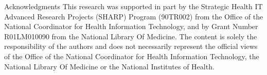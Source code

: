\documentclass[final]{beamer}
\newcommand{\code}[1]{\texttt{\small #1}}
\begin{document}
\begin{frame}[fragile]
\begin{columns}[t]
\begin{column}{.45\linewidth}
%
%

    \begin{block}{Acknowledgments}
    {
            \scriptsize
            This research was supported in part by the Strategic Health IT Advanced Research Projects (SHARP) Program (90TR002) from the Office of the National Coordinator for Health Information Technology, and by Grant Number R01LM010090 from the National Library Of Medicine. The content is solely the responsibility of the authors and does not necessarily represent the official views of the Office of the National Coordinator for Health Information Technology, the National Library Of Medicine or the National Institutes of Health.
    }

    \end{block}
    
  \end{column}

\end{columns}
\vfill
\end{frame}
\end{document}
